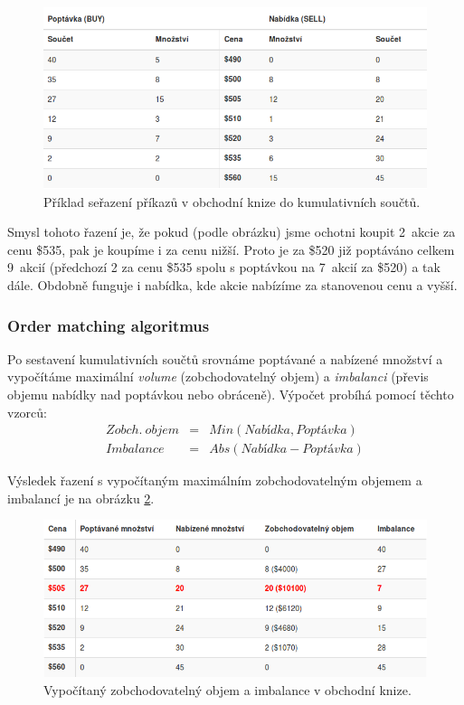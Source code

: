 \documentclass[thesis=M,czech]{FITthesis}[2012/06/26]
\begin{document}
\begin{figure}[h]
	\centering
	\includegraphics[width=1\textwidth]{images/orderbook_sum}
 	\caption[Obchodní kniha a kumulativní součty]{Příklad seřazení příkazů v obchodní knize do kumulativních součtů.}
 	\label{fig:orderbook_sum} 	
\end{figure}

	Smysl tohoto řazení je, že pokud (podle obrázku) jsme ochotni koupit 2~akcie za cenu \$535, pak je koupíme i za cenu nižší. Proto je za \$520 již poptáváno celkem 9~akcií (předchozí 2 za cenu \$535 spolu s poptávkou na 7~akcií za \$520) a tak dále. Obdobně funguje i nabídka, kde akcie nabízíme za stanovenou cenu a vyšší.
	
\subsubsection{Order matching algoritmus}
	
	Po sestavení kumulativních součtů srovnáme poptávané a nabízené množství a vypočítáme maximální \textit{volume} (zobchodovatelný objem) a \textit{imbalanci} (převis objemu nabídky nad poptávkou nebo obráceně). Výpočet probíhá pomocí těchto vzorců:
\begin{eqnarray}
    Zobch.~objem &= &Min(Nabídka, Poptávka) \nonumber \\
    Imbalance &= &Abs(Nabídka - Poptávka) \nonumber
\end{eqnarray}

	Výsledek řazení s vypočítaným maximálním zobchodovatelným objemem a imbalancí je na obrázku \ref{fig:orderbook_tradable_volume}.
	
\begin{figure}[h]
	\centering
	\includegraphics[width=1\textwidth]{images/orderbook_tradable_volume}
 	\caption[Obchodní kniha a zobchodovatelný objem s imbalancí]{Vypočítaný zobchodovatelný objem a imbalance v obchodní knize.}
 	\label{fig:orderbook_tradable_volume} 	
\end{figure}
	
\end{document}
